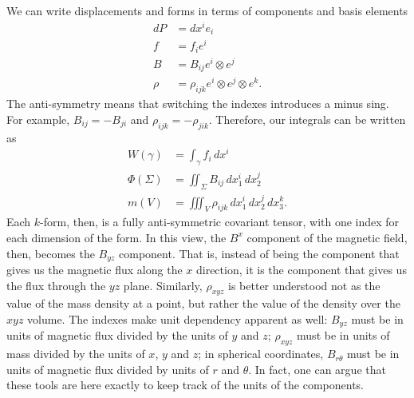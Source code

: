 We can write displacements and forms in terms of components and basis elements
\begin{equation}
	\begin{aligned}
	dP &= dx^i e_i \\
		f &= f_i e^i \\
		B &= B_{ij} e^i \otimes e^j \\
		\rho &= \rho_{ijk} e^i \otimes e^j \otimes e^k.
	\end{aligned}
\end{equation}
The anti-symmetry means that switching the indexes introduces a minus sing. For example, $B_{ij} = - B_{ji}$ and $\rho_{ijk} = - \rho_{jik}$. Therefore, our integrals can be written as
\begin{equation}
	\begin{aligned}
		W(\gamma) &= \int_\gamma f_i \, dx^i \\
		\Phi(\Sigma) &= \iint_\Sigma B_{ij} \, dx_1^i \, dx_2^j \\
		m(V) &= \iiint_V \rho_{ijk} \, dx_1^i \, dx_2^j \, dx_3^k.
	\end{aligned}
\end{equation}
Each $k$-form, then, is a fully anti-symmetric covariant tensor, with one index for each dimension of the form. In this view, the $B^x$ component of the magnetic field, then, becomes the $B_{yz}$ component. That is, instead of being the component that gives us the magnetic flux along the $x$ direction, it is the component that gives us the flux through the $yz$ plane. Similarly, $\rho_{xyz}$ is better understood not as the value of the mass density at a point, but rather the value of the density over the $xyz$ volume. The indexes make unit dependency apparent as well: $B_{yz}$ must be in units of magnetic flux divided by the units of $y$ and $z$; $\rho_{xyz}$ must be in units of mass divided by the units of $x$, $y$ and $z$; in spherical coordinates, $B_{r\theta}$ must be in units of magnetic flux divided by units of $r$ and $\theta$. In fact, one can argue that these tools are here exactly to keep track of the units of the components.

